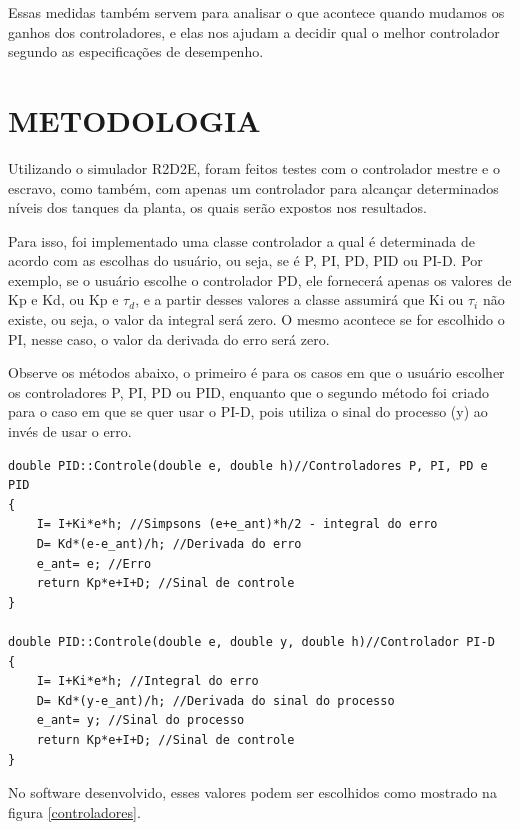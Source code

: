 \documentclass[a4paper,12pt]{article}
\begin{document}
\hspace{4ex}Essas medidas também servem para analisar o que acontece quando mudamos os ganhos dos controladores, e elas nos ajudam a decidir qual o melhor controlador segundo as especificações de desempenho.


\newpage


\thispagestyle{main}

\section{METODOLOGIA}

\hspace{4ex}Utilizando o simulador R2D2E, foram feitos testes com o controlador mestre e o escravo, como também, com apenas um controlador para alcançar determinados níveis dos tanques da planta, os quais serão expostos nos resultados.

\hspace{4ex}Para isso, foi implementado uma classe controlador a qual é determinada de acordo com as escolhas do usuário, ou seja, se é P, PI, PD, PID ou PI-D. Por exemplo, se o usuário escolhe o controlador PD, ele fornecerá apenas os valores de Kp e Kd, ou Kp e $\tau_d$, e a partir desses valores a classe assumirá que Ki ou $\tau_i$ não existe, ou seja, o valor da integral será zero. O mesmo acontece se for escolhido o PI, nesse caso, o valor da derivada do erro será zero.

\hspace{4ex}Observe os métodos abaixo, o primeiro é para os casos em que o usuário escolher os controladores P, PI, PD ou PID, enquanto que o segundo método foi criado para o caso em que se quer usar o PI-D, pois utiliza o sinal do processo (y) ao invés de usar o erro.
\begin{lstlisting}
double PID::Controle(double e, double h)//Controladores P, PI, PD e PID
{
    I= I+Ki*e*h; //Simpsons (e+e_ant)*h/2 - integral do erro
    D= Kd*(e-e_ant)/h; //Derivada do erro
    e_ant= e; //Erro
    return Kp*e+I+D; //Sinal de controle
}

double PID::Controle(double e, double y, double h)//Controlador PI-D
{
    I= I+Ki*e*h; //Integral do erro
    D= Kd*(y-e_ant)/h; //Derivada do sinal do processo
    e_ant= y; //Sinal do processo
    return Kp*e+I+D; //Sinal de controle
}
\end{lstlisting}
\hspace{4ex}No software desenvolvido, esses valores podem ser escolhidos como mostrado na figura \ref{controladores}.
\end{document}
